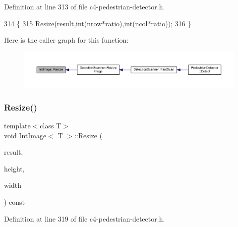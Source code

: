 Definition at line 313 of file c4-\/pedestrian-\/detector.\+h.


\begin{DoxyCode}
314 \{
315     \mbox{\hyperlink{class_int_image_a6eb852d06d8365476dba0760d9319e59}{Resize}}(result,\textcolor{keywordtype}{int}(\mbox{\hyperlink{class_array2d_c_a12f690f7195f7674a86a7e1eedbc473c}{nrow}}*ratio),\textcolor{keywordtype}{int}(\mbox{\hyperlink{class_array2d_c_a27e0f8f40f644831cd7c750db59dc28a}{ncol}}*ratio));
316 \}
\end{DoxyCode}
Here is the caller graph for this function\+:\nopagebreak
\begin{figure}[H]
\begin{center}
\leavevmode
\includegraphics[width=350pt]{class_int_image_a6eb852d06d8365476dba0760d9319e59_icgraph}
\end{center}
\end{figure}
\mbox{\label{class_int_image_a280423236cc08aca573725950e913467}} 
\subsubsection{\texorpdfstring{Resize()}{Resize()}\hspace{0.1cm}{\footnotesize\ttfamily [2/2]}}
{\footnotesize\ttfamily template$<$class T$>$ \\
void \mbox{\hyperlink{class_int_image}{Int\+Image}}$<$ T $>$\+::Resize (\begin{DoxyParamCaption}\item[{\mbox{\hyperlink{class_int_image}{Int\+Image}}$<$ T $>$ \&}]{result,  }\item[{const int}]{height,  }\item[{const int}]{width }\end{DoxyParamCaption}) const}



Definition at line 319 of file c4-\/pedestrian-\/detector.\+h.


